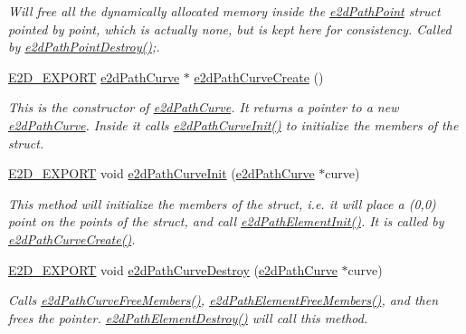 \begin{DoxyCompactItemize}
\begin{DoxyCompactList}\small\item\em Will free all the dynamically allocated memory inside the \hyperlink{structe2dPathPoint}{e2d\-Path\-Point} struct pointed by point, which is actually none, but is kept here for consistency. Called by \hyperlink{group__e2dPath_ga62b1763b895dc904ccfdc690ea8eb602}{e2d\-Path\-Point\-Destroy()};. \end{DoxyCompactList}\item 
\hyperlink{Ez2DS_8h_a9f14e9cb869e1a85fdaba03afcca0df9}{E2\-D\-\_\-\-E\-X\-P\-O\-R\-T} \hyperlink{structe2dPathCurve}{e2d\-Path\-Curve} $\ast$ \hyperlink{group__e2dPath_gaae6768f9ef3a8ffba141c0d758c7ad6a}{e2d\-Path\-Curve\-Create} ()
\begin{DoxyCompactList}\small\item\em This is the constructor of \hyperlink{structe2dPathCurve}{e2d\-Path\-Curve}. It returns a pointer to a new \hyperlink{structe2dPathCurve}{e2d\-Path\-Curve}. Inside it calls \hyperlink{group__e2dPath_ga86e0a9130ed6f05da4dff05c401e661b}{e2d\-Path\-Curve\-Init()} to initialize the members of the struct. \end{DoxyCompactList}\item 
\hyperlink{Ez2DS_8h_a9f14e9cb869e1a85fdaba03afcca0df9}{E2\-D\-\_\-\-E\-X\-P\-O\-R\-T} void \hyperlink{group__e2dPath_ga86e0a9130ed6f05da4dff05c401e661b}{e2d\-Path\-Curve\-Init} (\hyperlink{structe2dPathCurve}{e2d\-Path\-Curve} $\ast$curve)
\begin{DoxyCompactList}\small\item\em This method will initialize the members of the struct, i.\-e. it will place a (0,0) point on the points of the struct, and call \hyperlink{group__e2dPath_gab17d15f04aabeec94a923839aaf5a49e}{e2d\-Path\-Element\-Init()}. It is called by \hyperlink{group__e2dPath_gaae6768f9ef3a8ffba141c0d758c7ad6a}{e2d\-Path\-Curve\-Create()}. \end{DoxyCompactList}\item 
\hyperlink{Ez2DS_8h_a9f14e9cb869e1a85fdaba03afcca0df9}{E2\-D\-\_\-\-E\-X\-P\-O\-R\-T} void \hyperlink{group__e2dPath_ga4d40d3c3d9a67d0af8581725f59cf2e4}{e2d\-Path\-Curve\-Destroy} (\hyperlink{structe2dPathCurve}{e2d\-Path\-Curve} $\ast$curve)
\begin{DoxyCompactList}\small\item\em Calls \hyperlink{group__e2dPath_ga16c606e0d0d346f8aa4ba8dd0d79b08f}{e2d\-Path\-Curve\-Free\-Members()}, \hyperlink{group__e2dPath_gad2a7aabaa1ebd19138bd24ad5ec0a97e}{e2d\-Path\-Element\-Free\-Members()}, and then frees the pointer. \hyperlink{group__e2dPath_ga334ce1c6b0f6c3868ab2d546c0e67c14}{e2d\-Path\-Element\-Destroy()} will call this method. \end{DoxyCompactList}\item 

\end{DoxyCompactItemize}
